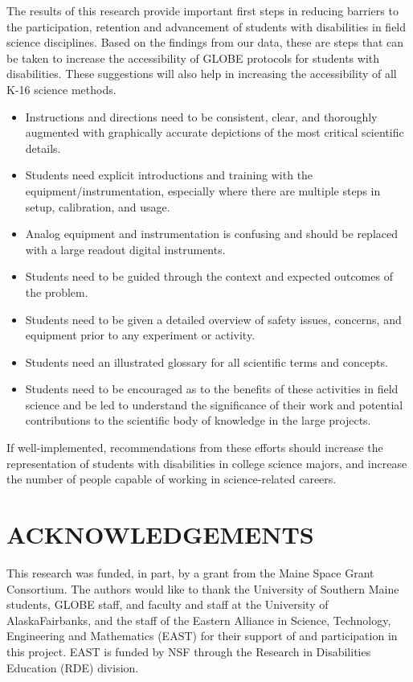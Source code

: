 \documentclass[11.5pt]{sig-alternate} %
\begin{document}
\begin{large}
The results of this research provide important first steps in reducing barriers to the participation, retention and advancement of students with disabilities in field science disciplines. Based on the findings from our data, these are steps that can be taken to increase the accessibility of GLOBE protocols for students with disabilities. These suggestions will also help in increasing the accessibility of all K-16 science methods.
\begin{itemize}
    \item Instructions and directions need to be consistent, clear, and thoroughly augmented with graphically accurate depictions of the most critical scientific details.
    \item  Students need explicit introductions and training with the equipment/instrumentation, especially where there are multiple  steps in setup, calibration, and usage.
    \item  Analog equipment and instrumentation is confusing and should be replaced with a large readout digital instruments.
    \item  Students need to be guided through the context and expected outcomes of the problem.
    \item  Students need to be given a detailed overview of safety issues, concerns, and equipment prior to any experiment or activity.
    \item  Students need an illustrated glossary for all scientific terms and concepts.
    \item  Students need to be encouraged as to the benefits of these activities in field science and be led to understand the significance of their work and potential contributions to the scientific body of knowledge in the large projects.
\end{itemize}
If well-implemented, recommendations from these efforts should increase the representation of students with disabilities in college science majors, and increase the number of people capable of working in science-related careers. 

\section*{ACKNOWLEDGEMENTS}

This research was funded, in part, by a grant from the Maine Space Grant Consortium. The authors would like to thank the University of Southern Maine students, GLOBE staff, and faculty and staff at the University of AlaskaFairbanks, and the staff of the Eastern Alliance in Science, Technology, Engineering and Mathematics (EAST) for their support of and participation in this project. EAST is funded by NSF through the Research in Disabilities Education (RDE) division. 


\end{large}
\end{document}
